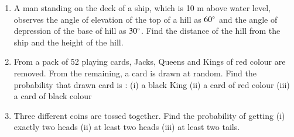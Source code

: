 \documentclass[book,11pt,onecolumn]{IEEEtran}
\renewcommand\thesection{\arabic{section}}
\begin{document}
\begin{enumerate}[label=\thesection.\arabic*.,ref=\thesection.\theenumi]
\item  A man standing on the deck of a ship, which is 10 m above water level, observes the angle of elevation of the top of a hill as $ 60\degree $ and the angle of depression of the base of hill as $ 30 \degree $. Find the distance of the hill from the ship and the height of the hill.\\
\item From a pack of 52 playing cards, Jacks, Queens and Kings of red colour are removed. From the remaining, a card is drawn at random. Find the probability that drawn card is :
(i) a black King (ii) a card of red colour (iii) a card of black colour\\
\item  Three different coins are tossed together. Find the probability of getting (i) exactly two heads (ii) at least two heads (iii) at least two tails.\\
\end{enumerate}
\end{document}
